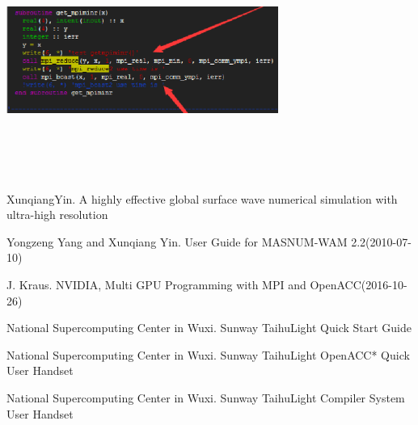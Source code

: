 \documentclass[conference,compsoc]{appendix/report}
\begin{document}
\includegraphics[width=3.50in,height=3.00in]{appendix/q24.eps}



\begin{thebibliography}{1}

  
XunqiangYin. A highly effective global surface wave numerical simulation with ultra-high resolution

Yongzeng Yang and Xunqiang Yin. User Guide for MASNUM-WAM 2.2(2010-07-10)

J. Kraus. NVIDIA, Multi GPU Programming with MPI and OpenACC(2016-10-26)

National Supercomputing Center in Wuxi. Sunway TaihuLight Quick Start Guide

National Supercomputing Center in Wuxi. Sunway TaihuLight OpenACC* Quick User Handset

National Supercomputing Center in Wuxi. Sunway TaihuLight Compiler System User Handset


\end{thebibliography}
\end{document}
